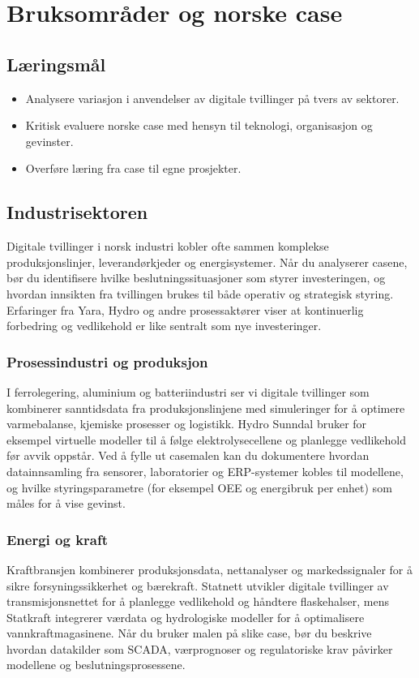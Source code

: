 \chapter{Bruksområder og norske case}
\label{chap:case}

\section{Læringsmål}
\begin{itemize}
    \item Analysere variasjon i anvendelser av digitale tvillinger på tvers av sektorer.
    \item Kritisk evaluere norske case med hensyn til teknologi, organisasjon og gevinster.
    \item Overføre læring fra case til egne prosjekter.
\end{itemize}

\section{Industrisektoren}
Digitale tvillinger i norsk industri kobler ofte sammen komplekse produksjonslinjer, leverandørkjeder og energisystemer. Når du analyserer casene, bør du identifisere hvilke beslutningssituasjoner som styrer investeringen, og hvordan innsikten fra tvillingen brukes til både operativ og strategisk styring. Erfaringer fra Yara, Hydro og andre prosessaktører viser at kontinuerlig forbedring og vedlikehold er like sentralt som nye investeringer.

\subsection*{Prosessindustri og produksjon}
I ferrolegering, aluminium og batteriindustri ser vi digitale tvillinger som kombinerer sanntidsdata fra produksjonslinjene med simuleringer for å optimere varmebalanse, kjemiske prosesser og logistikk. Hydro Sunndal bruker for eksempel virtuelle modeller til å følge elektrolysecellene og planlegge vedlikehold før avvik oppstår. Ved å fylle ut casemalen kan du dokumentere hvordan datainnsamling fra sensorer, laboratorier og ERP-systemer kobles til modellene, og hvilke styringsparametre (for eksempel OEE og energibruk per enhet) som måles for å vise gevinst.

\subsection*{Energi og kraft}
Kraftbransjen kombinerer produksjonsdata, nettanalyser og markedssignaler for å sikre forsyningssikkerhet og bærekraft. Statnett utvikler digitale tvillinger av transmisjonsnettet for å planlegge vedlikehold og håndtere flaskehalser, mens Statkraft integrerer værdata og hydrologiske modeller for å optimalisere vannkraftmagasinene. Når du bruker malen på slike case, bør du beskrive hvordan datakilder som SCADA, værprognoser og regulatoriske krav påvirker modellene og beslutningsprosessene.

